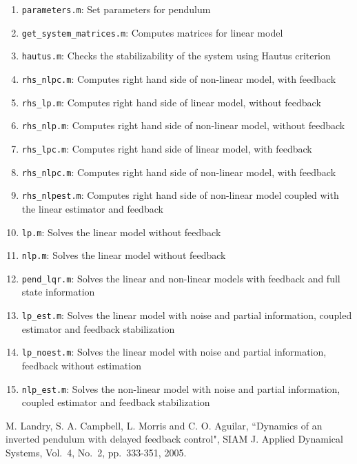 \documentclass[12pt]{article}
\begin{document}
\begin{enumerate}

\item {\tt parameters.m}: Set parameters for pendulum

\item {\tt get\_system\_matrices.m}: Computes matrices for linear model

\item {\tt hautus.m}: Checks the stabilizability of the system using Hautus criterion
\item {\tt rhs\_nlpc.m}: Computes right hand side of non-linear model, with feedback
\item {\tt rhs\_lp.m}: Computes right hand side of linear model, without feedback

\item {\tt rhs\_nlp.m}: Computes right hand side of non-linear model, without feedback

\item {\tt rhs\_lpc.m}: Computes right hand side of linear model, with feedback

\item {\tt rhs\_nlpc.m}: Computes right hand side of non-linear model, with feedback

\item {\tt rhs\_nlpest.m}: Computes right hand side of non-linear model coupled with the linear estimator and feedback

\item {\tt lp.m}: Solves the linear model without feedback

\item {\tt nlp.m}: Solves the linear model without feedback

\item {\tt pend\_lqr.m}: Solves the linear and non-linear models with feedback and full state information

\item {\tt lp\_est.m}: Solves the linear model with noise and partial information, coupled estimator and feedback stabilization

\item {\tt lp\_noest.m}: Solves the linear model with noise and partial information, feedback without estimation

\item {\tt nlp\_est.m}: Solves the non-linear model with noise and partial information, coupled estimator and feedback stabilization

\end{enumerate}

\begin{thebibliography}{99}

 M. Landry, S. A. Campbell, L. Morris and C. O. Aguilar, ``Dynamics of an inverted pendulum with delayed feedback control", SIAM J. Applied Dynamical Systems, Vol.~4, No.~2, pp.~333-351, 2005.

\end{thebibliography}
\end{document}
